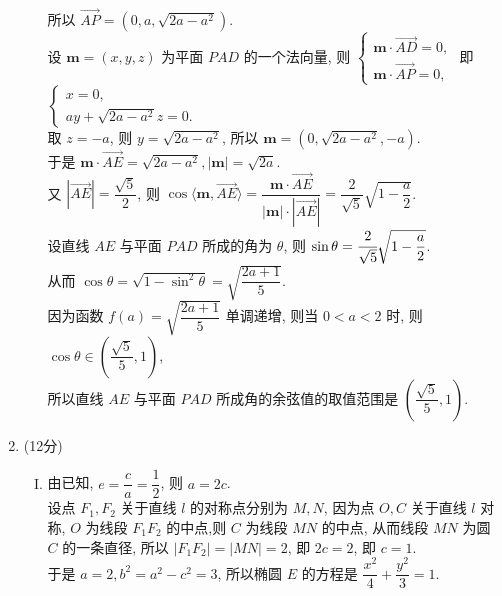 \documentclass[11pt]{article}
\begin{document}
\begin{enumerate}
\begin{enumerate}[(I)]
		\\所以 $\overrightarrow{A P}=\left(0, a, \sqrt{2 a-a^{2}}\right)$. 
		\\设 $\boldsymbol{m}=(x, y, z)$ 为平面 $P A D$ 的一个法向量, 则 $\left\{\begin{array}{l}\boldsymbol{m} \cdot \overrightarrow{A D}=0, \\ \boldsymbol{m} \cdot \overrightarrow{A P}=0,\end{array}\right.$ 即 $\left\{\begin{array}{l}x=0, \\ a y+\sqrt{2 a-a^{2}} z=0 .\end{array}\right.$
		\\取 $z=-a$, 则 $y=\sqrt{2 a-a^{2}}$, 所以 $\boldsymbol{m}=\left(0, \sqrt{2 a-a^{2}},-a\right)$.
		\\于是 $\boldsymbol{m} \cdot \overrightarrow{A E}=\sqrt{2 a-a^{2}},|\boldsymbol{m}|=\sqrt{2 a}$.
		\\又 $|\overrightarrow{A E}|=\dfrac{\sqrt{5}}{2}$, 则 $\cos \langle\boldsymbol{m}, \overrightarrow{A E}\rangle=\dfrac{\boldsymbol{m} \cdot \overrightarrow{A E}}{|\boldsymbol{m}| \cdot|\overrightarrow{A E}|}=\dfrac{2}{\sqrt{5}} \sqrt{1-\dfrac{a}{2}}$.
		\\设直线 $A E$ 与平面 $P A D$ 所成的角为 $\theta$, 则 $\sin \theta=\cfrac{2}{\sqrt{5}} \sqrt{1-\dfrac{a}{2}}$.
		\\从而 $\cos \theta=\sqrt{1-\sin ^{2} \theta}=\sqrt{\dfrac{2 a+1}{5}}$.
		\\因为函数 $f(a)=\sqrt{\dfrac{2 a+1}{5}}$ 单调递增, 则当 $0<a<2$ 时, 则 $\cos \theta \in\left(\dfrac{\sqrt{5}}{5}, 1\right)$,
		\\所以直线 $A E$ 与平面 $P A D$ 所成角的余弦值的取值范围是 $\left(\dfrac{\sqrt{5}}{5}, 1\right)$.
	\end{enumerate}
	\item (12分)
	\begin{enumerate}[(I)]
		\item 由已知, $e=\dfrac{c}{a}=\dfrac{1}{2}$, 则 $a=2 c$.
		\\设点 $F_{1}, F_{2}$ 关于直线 $l$ 的对称点分别为 $M, N$, 因为点 $O, C$ 关于直线 $l$ 对称, $O$ 为线段 $F_{1} F_{2}$ 的中点,则 $C$ 为线段 $M N$ 的中点, 从而线段 $M N$ 为圆 $C$ 的一条直径, 所以 $\left|F_{1} F_{2}\right|=|M N|=2$, 即 $2 c=2$, 即 $c=1$.
		\\于是 $a=2, b^{2}=a^{2}-c^{2}=3$, 所以椭圆 $E$ 的方程是 $\dfrac{x^{2}}{4}+\dfrac{y^{2}}{3}=1$.

\end{enumerate}
\end{enumerate}
\end{document}
